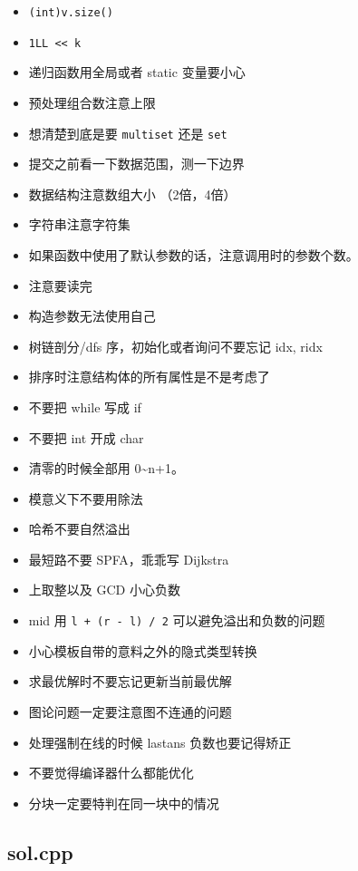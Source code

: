 \documentclass[]{article}
\providecommand{\tightlist}{%
  \setlength{\itemsep}{0pt}\setlength{\parskip}{0pt}}
\begin{document}
\begin{itemize}
\tightlist
\item
  \texttt{(int)v.size()}
\item
  \texttt{1LL\ \textless{}\textless{}\ k}
\item
  递归函数用全局或者 static 变量要小心
\item
  预处理组合数注意上限
\item
  想清楚到底是要 \texttt{multiset} 还是 \texttt{set}
\item
  提交之前看一下数据范围，测一下边界
\item
  数据结构注意数组大小 （2倍，4倍）
\item
  字符串注意字符集
\item
  如果函数中使用了默认参数的话，注意调用时的参数个数。
\item
  注意要读完
\item
  构造参数无法使用自己
\item
  树链剖分/dfs 序，初始化或者询问不要忘记 idx, ridx
\item
  排序时注意结构体的所有属性是不是考虑了
\item
  不要把 while 写成 if
\item
  不要把 int 开成 char
\item
  清零的时候全部用 0\textasciitilde n+1。
\item
  模意义下不要用除法
\item
  哈希不要自然溢出
\item
  最短路不要 SPFA，乖乖写 Dijkstra
\item
  上取整以及 GCD 小心负数
\item
  mid 用 \texttt{l\ +\ (r\ -\ l)\ /\ 2} 可以避免溢出和负数的问题
\item
  小心模板自带的意料之外的隐式类型转换
\item
  求最优解时不要忘记更新当前最优解
\item
  图论问题一定要注意图不连通的问题
\item
  处理强制在线的时候 lastans 负数也要记得矫正
\item
  不要觉得编译器什么都能优化
\item
  分块一定要特判在同一块中的情况
\end{itemize}

\hypertarget{sol.cpp}{%
\subsection{sol.cpp}\label{sol.cpp}}
\end{document}
